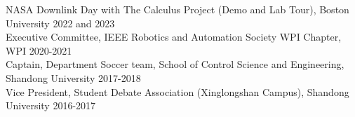 NASA Downlink Day with The Calculus Project (Demo and Lab Tour), Boston University \hfill 2022 and 2023\\
Executive Committee, IEEE Robotics and Automation Society WPI Chapter, WPI \hfill 2020-2021\\
Captain, Department Soccer team, School of Control Science and Engineering, Shandong University \hfill 2017-2018\\
Vice President, Student Debate Association (Xinglongshan Campus), Shandong University \hfill 2016-2017\\